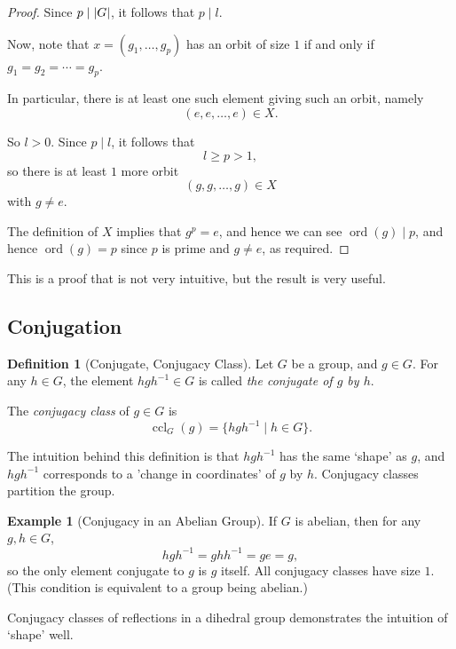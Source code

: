 \documentclass{article}
\theoremstyle{definition}
\newtheorem{definition}[theorem]{Definition}
\newtheorem*{example*}{Example}
\theoremstyle{remark}
\DeclarePairedDelimiter{\abs}{\lvert}{\rvert}
\newcommand{\pqty}[1]{\left(#1\right)}
\newcommand{\set}[2]{\{#1\mid #2\}}
\newcommand{\inverse}{^{-1}}
\newcommand{\divides}{\mid}
\newcommand{\ccl}{\operatorname{ccl}}
\newcommand{\ord}{\operatorname{ord}}
\begin{document}
\begin{proof}
    Since \(p \divides \abs{G}\), it follows that \(p \divides l\).

    Now, note that \(x = \pqty{g_1, \ldots, g_p}\) has an orbit of size \(1\) if and only if \(g_1 = g_2 = \cdots = g_p\).

    In particular, there is at least one such element giving such an orbit, namely
    \[
        \pqty{e, e, \ldots, e} \in X.
    \]

    So \(l > 0\). Since \(p \divides l\), it follows that
    \[
        l \geq p > 1,
    \]
    so there is at least \(1\) more orbit
    \[
        \pqty{g, g, \ldots, g} \in X
    \]
    with \(g \neq e\).

    The definition of \(X\) implies that \(g^p = e\), and hence we can see \(\ord\pqty{g} \divides p\), and hence \(\ord\pqty{g} = p\) since \(p\) is prime and \(g \neq e\), as required.
\end{proof}

This is a proof that is not very intuitive, but the result is very useful.

\subsection{Conjugation}
\label{sec:conjugation}

\begin{definition}[Conjugate, Conjugacy Class]
    \label{def:conjugate-ccl}%
    Let \(G\) be a group, and \(g \in G\). For any \(h \in G\), the element \(hgh\inverse \in G\) is called \emph{the conjugate of \(g\) by \(h\)}.

    The \emph{conjugacy class} of \(g \in G\) is
    \[
        \ccl_{G}\pqty{g} = \set{hgh\inverse}{h \in G}.
    \]
\end{definition}

The intuition behind this definition is that \(hgh\inverse\) has the same `shape' as \(g\), and \(hgh\inverse\) corresponds to a 'change in coordinates' of \(g\) by \(h\). Conjugacy classes partition the group.

\begin{example*}[Conjugacy in an Abelian Group]
    If \(G\) is abelian, then for any \(g, h \in G\),
    \[
        hgh\inverse = ghh\inverse = ge = g,
    \]
    so the only element conjugate to \(g\) is \(g\) itself. All conjugacy classes have size \(1\). (This condition is equivalent to a group being abelian.)
\end{example*}

Conjugacy classes of reflections in a dihedral group demonstrates the intuition of `shape' well.
\end{document}
